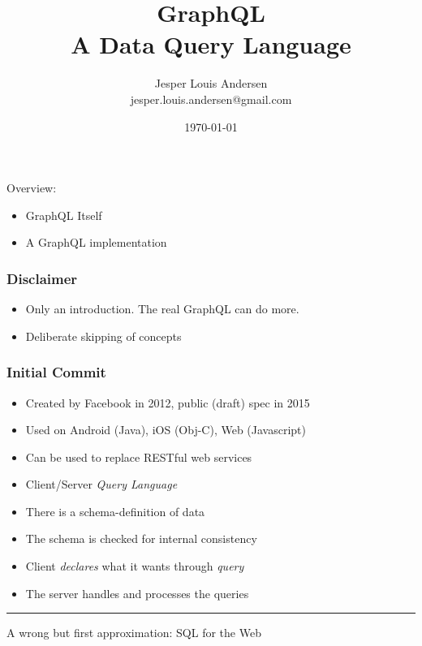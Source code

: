 \documentclass[lualatex]{beamer}
\author{Jesper Louis Andersen\\jesper.louis.andersen@gmail.com}
\date{\today{}}
\title{GraphQL\\A Data Query Language}
\begin{document}
\maketitle

\begin{frame}
  Overview:
  \begin{itemize}
  \item GraphQL Itself
  \item A GraphQL implementation
  \end{itemize}
\end{frame}

\begin{frame}
  \frametitle{Disclaimer}
  \begin{itemize}
  \item Only an introduction. The real GraphQL can do more.
  \item Deliberate skipping of concepts
  \end{itemize}
\end{frame}

\begin{frame}
  \frametitle{Initial Commit}
  \begin{itemize}
  \item Created by Facebook in 2012, public (draft) spec in 2015
  \item Used on Android (Java), iOS (Obj-C), Web (Javascript)
  \item Can be used to replace RESTful web services
  \item Client/Server \emph{Query Language}
  \end{itemize}
\end{frame}

\begin{frame}
  \begin{itemize}
  \item There is a schema-definition of data
  \item The schema is checked for internal consistency
  \item Client \emph{declares} what it wants through \emph{query}
  \item The server handles and processes the queries
  \end{itemize}
  
  \rule{\textwidth}{1pt}
  A wrong but first approximation: SQL for the Web
\end{frame}
\end{document}
